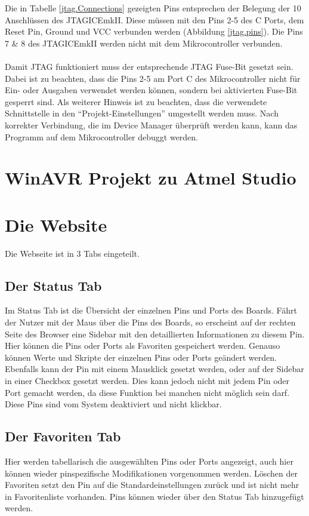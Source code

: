Die in Tabelle \ref{jtag.Connections} gezeigten Pins entsprechen der Belegung
der 10 Anschlüssen des JTAGICEmkII. Diese müssen mit den Pins 2-5 des C Ports, dem
Reset Pin, Ground und VCC verbunden werden (Abbildung \ref{jtag.pins}). Die Pins 7 \& 8
des JTAGICEmkII werden nicht mit dem Mikrocontroller verbunden.\\
\\
Damit \ac{JTAG} funktioniert muss der entsprechende JTAG Fuse-Bit gesetzt sein.
Dabei ist zu beachten, dass die Pins 2-5 am Port C des Mikrocontroller nicht für
Ein- oder Ausgaben verwendet werden können, sondern bei aktivierten Fuse-Bit
gesperrt sind. Als weiterer Hinweis ist zu beachten, dass die verwendete
Schnittstelle in den "`Projekt-Einstellungen"' umgestellt werden muss. Nach
korrekter Verbindung, die im Device Manager überprüft werden kann, kann das
Programm auf dem Mikrocontroller debuggt werden.

\section{WinAVR Projekt zu Atmel Studio}


\section{Die Website}

Die Webseite ist in 3 Tabs eingeteilt. 

\subsection{Der Status Tab}
Im Status Tab ist die Übersicht der
einzelnen Pins und Ports des Boards. Fährt der Nutzer mit der Maus über die Pins des
Boards, so erscheint auf der rechten Seite des Browser eine Sidebar mit den
detaillierten Informationen zu diesem Pin. Hier können die Pins oder Ports
als Favoriten gespeichert werden. Genauso können Werte und Skripte der einzelnen
Pins oder Ports geändert werden.\\
Ebenfalls kann der Pin mit einem Mausklick gesetzt werden, oder auf der Sidebar in einer 
Checkbox gesetzt werden. Dies kann jedoch nicht mit jedem Pin oder Port gemacht werden, da 
diese Funktion bei manchen nicht möglich sein darf. Diese Pins sind vom System deaktiviert und 
nicht klickbar.
\subsection{Der Favoriten Tab}
Hier werden tabellarisch die ausgewählten Pins oder Ports angezeigt, auch hier
können wieder pinspezifische Modifikationen vorgenommen werden. Löschen der
Favoriten setzt den Pin auf die Standardeinstellungen zurück und ist nicht mehr
in Favoritenliste vorhanden. Pins können wieder über den Status Tab hinzugefügt
werden.

